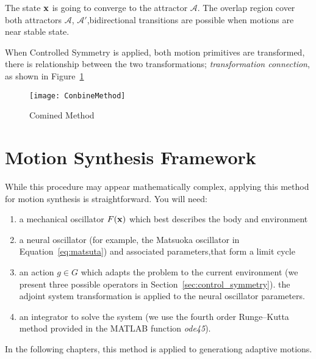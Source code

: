 The state $\mathbf{x}$ is going to converge to the attractor $\mathcal{A}$.
The overlap region cover both attractors $\mathcal{A}$, $\mathcal{A'}$,bidirectional transitions are possible when motions are near stable state.

When Controlled Symmetry is applied, both motion primitives are transformed, there is relationship between the two transformations; \emph{transformation connection}, as shown in Figure~\ref{fig:Combine}

\begin{figure}[!htbp]
  \begin{center}
      \texttt{[image: ConbineMethod]}
    \caption{Comined Method}
    \label{fig:Combine}
  \end{center}
\end{figure}

\section{Motion Synthesis Framework}
While this procedure may appear mathematically complex, applying this method for motion synthesis is straightforward. 
You will need:
\begin{enumerate}
\item a mechanical oscillator $F(\mathbf{x})$ which best describes the body and environment
\item a neural oscillator (for example, the Matsuoka oscillator in Equation~\ref{eq:matsuta}) and associated parameters,that form a limit cycle

\item an action $g \in G$ which adapts the problem to the current environment (we present three possible operators in Section~\ref{sec:control_symmetry}). the adjoint system transformation  is applied to the neural oscillator parameters.

\item an integrator to solve the system (we use the fourth order Runge--Kutta method provided in the {MATLAB} function \emph{ode45}).
\end{enumerate}
In the following chapters, this method is applied to generationg adaptive motions.




